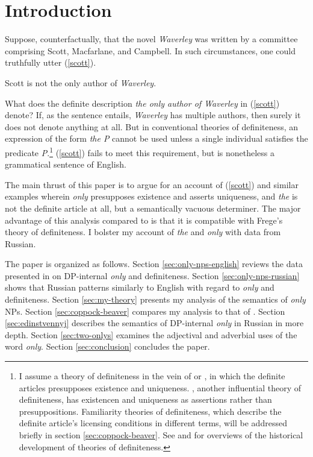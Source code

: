 \section{Introduction \label{sec:intro}}
Suppose, counterfactually, that the novel \textit{Waverley} was written by a committee comprising Scott, Macfarlane, and Campbell. In such circumstances, one could truthfully utter (\ref{scott}).

\begin{exe}
	\ex \label{scott} Scott is not the only author of \textit{Waverley}.\\
	\hspace*{\fill} \citep{cb2015}
\end{exe}

What does the definite description \textit{the only author of Waverley} in (\ref{scott}) denote? If, as the sentence entails, \textit{Waverley} has multiple authors, then surely it does not denote anything at all. But in conventional theories of definiteness, an expression of the form \textit{the P} cannot be used unless a single individual satisfies the predicate \textit{P}.\footnote{I assume a theory of definiteness in the vein of \citet{frege} or \citet{strawson50}, in which the definite articles presupposes existence and uniqueness. \citet{russell}, another influential theory of definiteness, has existencen and uniqueness as assertions rather than presuppositions. Familiarity theories of definiteness, which describe the definite article's licensing conditions in different terms, will be addressed briefly in section \ref{sec:coppock-beaver}. See \citet[chap. 1]{schwarz09} and \citet{horn-abbott-2012} for overviews of the historical development of theories of definiteness.} (\ref{scott}) fails to meet this requirement, but is nonetheless a grammatical sentence of English.

The main thrust of this paper is to argue for an account of (\ref{scott}) and similar examples wherein \textit{only} presupposes existence and asserts uniqueness, and \textit{the} is not the definite article at all, but a semantically vacuous determiner. The major advantage of this analysis compared to  is that it is compatible with Frege's theory of definiteness. I bolster my account of \textit{the} and \textit{only} with data from Russian.

The paper is organized as follows. Section \ref{sec:only-nps-english} reviews the data presented in \citet{cb2015} on DP-internal \textit{only} and definiteness. Section \ref{sec:only-nps-russian} shows that Russian patterns similarly to English with regard to \textit{only} and definiteness. Section \ref{sec:my-theory} presents my analysis of the semantics of \textit{only} NPs. Section \ref{sec:coppock-beaver} compares my analysis to that of \citet{cb2015}. Section \ref{sec:edinstvennyj} describes the semantics of DP-internal \textit{only} in Russian in more depth. Section \ref{sec:two-onlys} examines the adjectival and adverbial uses of the word \textit{only}. Section \ref{sec:conclusion} concludes the paper.